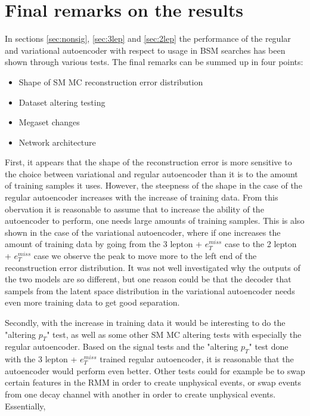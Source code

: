 \section{Final remarks on the results}
In sections \ref{sec:nonsig}, \ref{sec:3lep} and \ref{sec:2lep} the performance 
of the regular and variational autoencoder with respect to usage in BSM 
searches has been shown through various tests. The final remarks can be summed 
up in four points:
\begin{itemize}
    
    \item Shape of SM MC reconstruction error distribution 
    \item Dataset altering testing
    \item Megaset changes 
    \item Network architecture

\end{itemize}
First, it appears that the shape of the reconstruction error is more sensitive 
to the choice between variational and regular autoencoder than it is to the 
amount of training samples it uses. However, the steepness of the shape in the 
case of the regular autoencoder increases with the increase of training data. 
From this obervation it is reasonable to assume that to increase the ability of 
the autoencoder to perform, one needs large amounts of training samples. This 
is also shown in the case of the variational autoencoder, where if one increases 
the amount of training data by going from the 3 lepton + $e_T^{miss}$ case to 
the 2 lepton + $e_T^{miss}$ case we observe the peak to move more to the left 
end of the reconstruction error distribution. It was not well investigated 
why the outputs of the two models are so different, but one reason could be 
that the decoder that sampels from the latent space distribution in the 
variational autoencoder needs even more training data to get good separation. \par 
Secondly, with the increase in training data it would be interesting to do the 
"altering $p_T$" test, as well as some other SM MC altering tests with especially the 
regular autoencoder. Based on the signal tests and the "altering $p_T$" test done with 
the 3 lepton + $e_T^{miss}$ trained regular autoencoder, it is reasonable that the 
autoencoder would perform even better. Other tests could for example be to swap 
certain features in the RMM in order to create unphysical events, or swap events from
one decay channel with another in order to create unphysical events. Essentially, 
